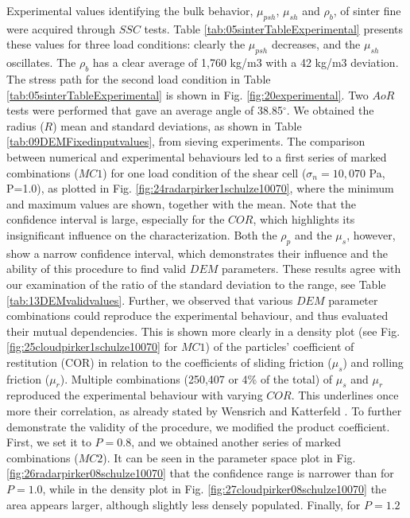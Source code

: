 \documentclass[review]{elsarticle}
\begin{document}
Experimental values identifying the bulk behavior, $\mu_{psh}$, $\mu_{sh}$ and $\rho_{b}$, 
of sinter fine were acquired through $SSC$ tests. 
Table \ref{tab:05sinterTableExperimental} presents
these values for three load conditions: clearly the $\mu_{psh}$ decreases, and 
the $\mu_{sh}$ oscillates.
The $\rho_b$ has a clear average of 1,760 kg/m3 with a 42 
kg/m3 deviation.
The stress path for the second load condition in Table
\ref{tab:05sinterTableExperimental} is shown in Fig.
\ref{fig:20experimental}.
Two $AoR$ tests were performed that gave an average angle of
38.85$^\circ$.
We obtained the radius ($R$) mean and standard
deviations, as shown in Table
\ref{tab:09DEMFixedinputvalues}, from sieving experiments.
The comparison between numerical and experimental behaviours led to a first
series of marked combinations ($MC1$) for one load condition of
the shear cell ($\sigma_n=10,070$ Pa, P=1.0), as plotted in Fig.
\ref{fig:24radarpirker1schulze10070}, where 
the minimum and maximum values are shown, together with the mean. 
Note that the confidence interval is large, 
especially for the $COR$, which highlights its insignificant influence on the
characterization.
Both the $\rho_p$  and the $\mu_s$, however, show a narrow confidence interval, 
which demonstrates their influence and the ability of this procedure to find
valid $DEM$ parameters.
These results agree with our examination of the ratio of the standard deviation
to the range, see Table \ref{tab:13DEMvalidvalues}.
Further, we observed that various $DEM$ parameter
combinations could reproduce the experimental behaviour, and thus evaluated
their mutual dependencies.
This is shown more clearly in a density plot (see Fig. 
\ref{fig:25cloudpirker1schulze10070} for $MC1$) 
of the particles' coefficient of restitution (COR) in relation to
the coefficients of sliding friction ($\mu_s$) and rolling friction ($\mu_r$). 
Multiple
combinations (250,407 or 4\% of the total) of $\mu_s$ and $\mu_r$ reproduced
the experimental behaviour with varying $COR$.
This underlines once more their correlation, as already stated by Wensrich and 
Katterfeld \cite{RefWorks:87}.
To further demonstrate the validity of the procedure, we modified the product
coefficient. 
First, we set it to $P=0.8$, and we obtained another
series of marked combinations ($MC2$).
It can be seen in the parameter space plot in Fig.
\ref{fig:26radarpirker08schulze10070} that the confidence range is narrower
than for $P=1.0$, while in the density plot in Fig. 
\ref{fig:27cloudpirker08schulze10070} the area
appears larger, although slightly less densely populated. Finally, for $P=1.2$
\end{document}
